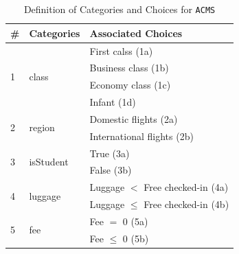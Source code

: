 \documentclass[10pt,journal,compsoc]{IEEEtran}
\begin{document}
\begin{table}[htb]
  \caption{Definition of Categories and Choices for \texttt{ACMS}}
  \label{table:categoriesofacms}
  \centering
  \begin{tabular}{lll} \toprule
  \#                &Categories                                                &Associated Choices      \\ \midrule
                    &\multicolumn{1}{l}{\multirow{4}{*}{class}}                &First calss (1a)        \\
  \multirow{2}{*}{1}&\multicolumn{1}{l}{}                                      &Business class (1b)     \\
                    &\multicolumn{1}{l}{}                                      &Economy class (1c)       \\
                    &\multicolumn{1}{l}{}                                      &Infant (1d)               \\ \midrule
  \multirow{2}{*}{2}&\multicolumn{1}{l}{\multirow{2}{*}{region}}               &Domestic flights (2a)     \\
                    &\multicolumn{1}{l}{}                                      &International flights (2b)    \\ \midrule
  \multirow{2}{*}{3}&\multicolumn{1}{l}{\multirow{2}{*}{isStudent}}            &True (3a)                    \\
                    &\multicolumn{1}{l}{}                                      &False (3b)                   \\ \midrule
  \multirow{2}{*}{4}&\multicolumn{1}{l}{\multirow{2}{*}{luggage}}              &Luggage $<$ Free checked-in (4a)    \\
                    &\multicolumn{1}{l}{}                                      &Luggage $\leq$ Free checked-in (4b)  \\ \midrule
  \multirow{2}{*}{5}&\multicolumn{1}{l}{\multirow{2}{*}{fee}}                  &Fee $=$ 0 (5a)                     \\
                    &\multicolumn{1}{l}{}                                      &Fee $\leq$ 0 (5b)                   \\ \bottomrule
  \end{tabular}
\end{table}
\end{document}
